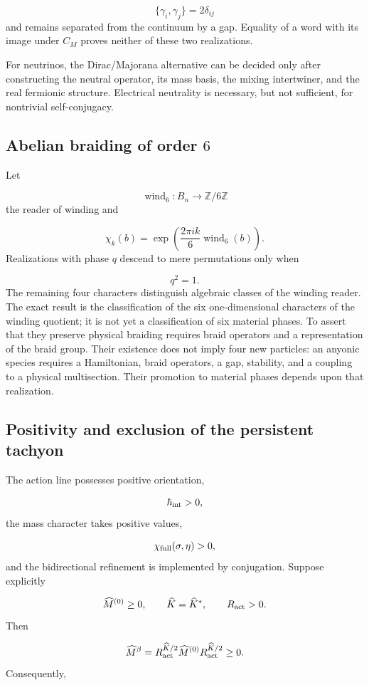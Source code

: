 \[
\{\gamma_i,\gamma_j\}=2\delta_{ij}
\]
and remains separated from the continuum by a gap. Equality of a word with
its image under \(C_M\) proves neither of these two realizations.

For neutrinos, the Dirac/Majorana alternative can be decided only after constructing the neutral operator, its mass basis, the mixing intertwiner, and the real fermionic structure. Electrical neutrality is necessary, but not sufficient, for nontrivial self-conjugacy.

\subsection{Abelian braiding of order \(6\)}
Let

\[
\operatorname{wind}_6:B_n\longrightarrow\mathbb Z/6\mathbb Z
\]
the reader of winding and

\[
\chi_k(b)=\exp\!\left(
\frac{2\pi i k}{6}\operatorname{wind}_6(b)\right).
\]
Realizations with phase \(q\) descend to mere permutations only when

\[
q^2=1.
\]
The remaining four characters distinguish algebraic classes of the winding reader. The exact result is the classification of the six one-dimensional characters of the winding quotient; it is not yet a classification of six material phases. To assert that they preserve physical braiding requires braid operators and a representation of the braid group. Their existence does not imply four new particles: an anyonic species requires a Hamiltonian, braid operators, a gap, stability, and a coupling to a physical multisection. Their promotion to material phases depends upon that realization.

\subsection{Positivity and exclusion of the persistent tachyon}
The action line possesses positive orientation,

\[
\hbar_{\rm int}>0,
\]
the mass character takes positive values,

\[
\chi_{\rm full}(\sigma,\eta)>0,
\]
and the bidirectional refinement is implemented by conjugation. Suppose explicitly

\[
\widehat M^{(0)}\ge0,
\qquad
\widehat K=\widehat K^*,
\qquad
R_{\rm act}>0.
\]
Then

\[
\widehat M^{\beta}
=R_{\rm act}^{\widehat K/2}
\widehat M^{(0)}
R_{\rm act}^{\widehat K/2}\ge0.
\]
Consequently,

